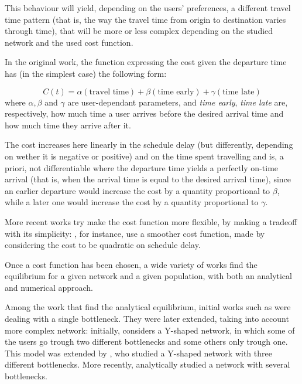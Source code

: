 This behaviour will yield, depending on the users' preferences,
a different travel time pattern (that is, the way the travel time from origin to destination varies through time),
that will be more or less complex depending on the studied network and the used cost function.

In the original work, the function expressing the cost given the departure time has (in the simplest case) the following form:

\begin{equation}
  \label{eq:cost_intro}
  C(t) = \alpha(\text{travel time}) + \beta (\text{time early}) + \gamma (\text{time late})
\end{equation}
where \(\alpha, \beta\) and \(\gamma\) are user-dependant parameters, and \textit{time early}, \textit{time late} are, respectively, how much time a user arrives before the desired arrival time and how much time they arrive after it.

The cost increases here linearly in the schedule delay (but differently, depending on wether it is negative or positive) and on the time spent travelling and is, a priori, not differentiable where the departure time yields a perfectly on-time arrival
(that is, when the arrival time is equal to the desired arrival time),
since an earlier departure would increase the cost by a quantity proportional to \(\beta\),
while a later one would increase the cost by a quantity proportional to \(\gamma\).

More recent works try make the cost function more flexible,
by making a tradeoff with its simplicity:
, for instance,
use a smoother cost function, made by considering the cost to be quadratic on schedule delay. 

Once a cost function has been chosen, a wide variety of works find the equilibrium for a given network and a given population,
with both an analytical and numerical approach.

Among the work that find the analytical equilibrium, initial works such as \textcite{de1983stochastic} were dealing with a single bottleneck.
They were later extended, taking into account more complex network: initially, \textcite{doi:10.1287/trsc.24.3.217} considers a Y-shaped network,
in which some of the users go trough two different bottlenecks and some others only trough one.
This model was extended by \textcite{doi:10.1287/trsc.27.2.148},
who studied a Y-shaped network with three different bottlenecks.
More recently, \textcite{AKAMATSU2015808} analytically studied a network with several bottlenecks.

